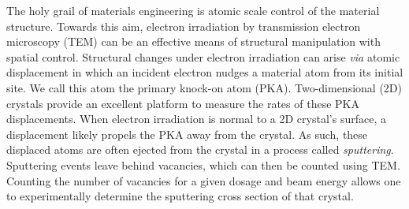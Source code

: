 \documentclass{article}
\begin{document}
The holy grail of materials engineering is atomic scale control of the
material structure.
Towards this aim, electron irradiation by transmission electron microscopy
(TEM) can be an effective means of structural manipulation with spatial
control.\cite{Banhart1999, Egerton2013, Zhao2017, Susi2019}
Structural changes under electron irradiation can arise \textit{via} atomic displacement
in which an incident electron nudges a material atom from its initial site.  We
call this atom the primary knock-on atom (PKA).  Two-dimensional (2D) crystals
provide an excellent platform to measure the rates of these PKA displacements.
When electron irradiation is normal to a 2D crystal's surface, a displacement
likely propels the PKA away from the crystal.
As such, these displaced atoms are often ejected from the crystal in a process
called \textit{sputtering}.  Sputtering events leave behind vacancies, which
can then be counted using TEM.
Counting the number of vacancies for a given dosage and beam energy allows one
to experimentally determine the sputtering cross section of that crystal.
\end{document}
